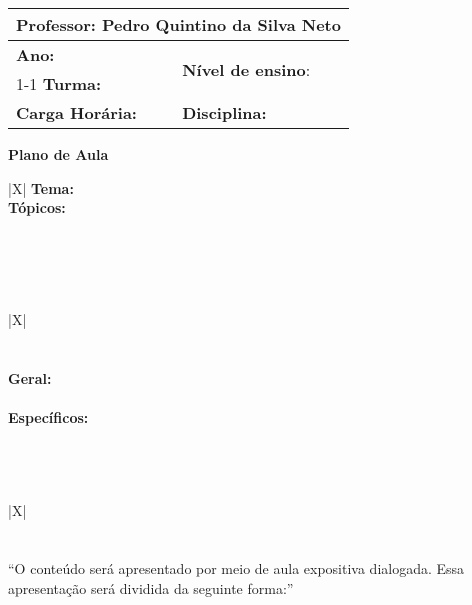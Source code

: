 \documentclass[a4paper,12pt,twoside]{report}
\newcommand{\tabitem}{\quad ~~\llap{\textbullet}~~}
\begin{document}
\noindent
\begin{tabularx}{\textwidth}{|X|X|}
\hline
\multicolumn{2}{|l|}{\textbf{Professor:} Pedro Quintino da Silva Neto}\\
\hline 
\textbf{Ano:} & \multirow{2}{*}{\textbf{Nível de ensino}:  }\\
\cline{1-1} \textbf{Turma:}  & \\
\hline
\multirow{1}{*}{\textbf{Carga Horária: }} & \textbf{Disciplina:} \\
\hline
\end{tabularx}

\begin{center}
    \textbf{Plano de Aula}
\end{center}
\vspace{-0.5cm}

\begin{xltabular}{\textwidth}{|X|}
\hline
\textbf{Tema: } \\
\textbf{Tópicos:}\\
\tabitem\\
\tabitem\\
\tabitem\\
\\\hline
\end{xltabular}

\begin{xltabular}{\textwidth}{|X|}
\hline {} \\ \hline 
\endfirsthead
\hline {} \\  \hline
\endhead
\hline {} \\ \hline
\endfoot
\hline
\endlastfoot
\textbf{Geral:}\\
\tabitem\\
\textbf{Específicos: }\\
\tabitem\\
\tabitem\\
\tabitem\\
\hline
\end{xltabular}


\begin{xltabular}{\textwidth}{|X|}
\hline {} \\ \hline 
\endfirsthead
\hline {} \\ \hline 
\endhead
\hline {} \\ \hline
\endfoot
\hline
\endlastfoot
``O conteúdo será apresentado por meio de aula expositiva dialogada. Essa apresentação será dividida da seguinte forma:''\\
\tabitem\\
\tabitem\\
\tabitem\\
\hline
\end{xltabular}
\end{document}
